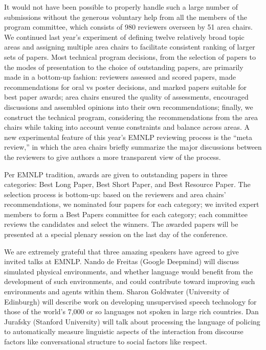 \documentclass[11pt]{article}
\begin{document}
It would not have been possible to properly handle such a large number of submissions without the generous voluntary help from all the members of the program committee, which consists of 980 reviewers overseen by 51 area chairs. We continued last year’s experiment of defining twelve relatively broad topic areas and assigning multiple area chairs to facilitate consistent ranking of larger sets of papers. Most technical program decisions, from the selection of papers to the modes of presentation to the choice of outstanding papers, are primarily made in a bottom-up fashion: reviewers assessed and scored papers, made recommendations for oral vs poster decisions, and marked papers suitable for best paper awards; area chairs ensured the quality of assessments, encouraged discussions and assembled opinions into their own recommendations; finally, we construct the technical program, considering the recommendations from the area chairs while taking into account venue constraints and balance across areas. A new experimental feature of this year’s EMNLP reviewing process is the “meta review,” in which the area chairs briefly summarize the major discussions between the reviewers to give authors a more transparent view of the process. 

Per EMNLP tradition, awards are given to outstanding papers in three categories: Best Long Paper, Best Short Paper, and Best Resource Paper. The selection process is bottom-up:
based on the reviewers and area chairs’ recommendations, we nominated four papers for each category; we invited expert members to form a Best Papers committee for each category; each committee reviews the candidates and select the winners. The awarded papers will be presented at a special plenary session on the last day of the conference. 

We are extremely grateful that three amazing speakers have agreed to give invited talks at EMNLP. Nando de Freitas (Google Deepmind) will discuss simulated physical environments, and whether language would benefit from the development of such environments, and could contribute toward improving such environments and agents within them. Sharon Goldwater (University of Edinburgh) will describe work on developing unsupervised speech technology for those of the world's 7,000 or so languages not spoken in large rich countries. Dan Jurafsky (Stanford University) will talk about processing the language of policing to automatically measure linguistic aspects of the interaction from discourse factors like conversational structure to social factors like respect. 
\end{document}

